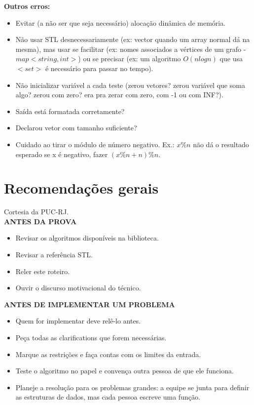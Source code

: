 \begin{multicols}{2}
\textbf{Outros erros:}
\begin{itemize}
\itemsep0em
\item Evitar (a não ser que seja necessário) alocação dinâmica de memória.
\item Não usar STL desnecessariamente (ex: vector quando um array normal dá na mesma), mas usar se facilitar (ex: nomes associados a vértices de um grafo - $map<string,int>$) ou se precisar (ex: um algoritmo $O(nlogn)$ que usa $<set>$ é necessário para passar no tempo).
\item Não inicializar variável a cada teste (zerou vetores? zerou variável que soma algo? zerou com zero? era pra zerar com zero, com -1 ou com INF?).
\item Saída está formatada corretamente?
\item Declarou vetor com tamanho suficiente?
\item Cuidado ao tirar o módulo de número negativo. Ex.: $x\%n$ não dá o resultado esperado se x é negativo, fazer $(x\%n + n)\%n$.
\end{itemize}

\end{multicols}

\section{Recomendações gerais}

Cortesia da PUC-RJ. \\

\textbf{ANTES DA PROVA}
\begin{itemize}
\itemsep0em
\item Revisar os algoritmos disponíveis na biblioteca.
\item Revisar a referência STL.
\item Reler este roteiro.
\item Ouvir o discurso motivacional do técnico.
\end{itemize}

\textbf{ANTES DE IMPLEMENTAR UM PROBLEMA}
\begin{itemize}
\itemsep0em
\item Quem for implementar deve relê-lo antes.
\item Peça todas as clarifications que forem necessárias.
\item Marque as restrições e faça contas com os limites da entrada.
\item Teste o algoritmo no papel e convença outra pessoa de que ele funciona.
\item Planeje a resolução para os problemas grandes: a equipe se junta para definir as estruturas de dados, mas cada pessoa escreve uma função.
\end{itemize}

